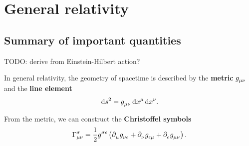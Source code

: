 \documentclass[a4paper,11pt,twoside]{report}
\newcommand\dif{\mathop{}\!\mathrm{d}}
\begin{document}
\appendix

\chapter{General relativity}
\section{Summary of important quantities}
\label{chap:gr_summary}

TODO: derive from Einstein-Hilbert action?

In general relativity, the geometry of spacetime is described by the \textbf{metric} $g\indices{_\mu_\nu}$ and the \textbf{line element}
\begin{equation}
	\dif s^2 = g\indices{_\mu_\nu} \dif x^\mu \dif x^\nu .
	\label{eq:def_line_elem}
\end{equation}

From the metric, we can construct the \textbf{Christoffel symbols}
\begin{equation}
	\Gamma^\sigma_{\mu \nu} = \frac{1}{2} g\indices{^\sigma^\epsilon} \left(
		\partial\indices{_\mu} g\indices{_\nu_\epsilon} +
		\partial\indices{_\nu} g\indices{_\epsilon_\mu} +
		\partial\indices{_\epsilon} g\indices{_\mu_\nu}
	\right) .
	\label{eq:def_christoffel}
\end{equation}
\end{document}
